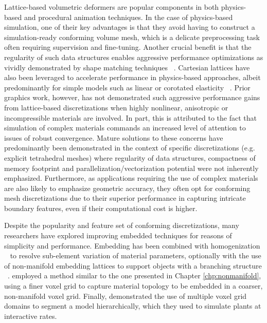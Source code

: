 Lattice-based volumetric deformers are popular components in both
physics-based and procedural animation techniques. In the case of
physics-based simulation, one of their key advantages is that they
avoid having to construct a simulation-ready conforming volume mesh,
which is a delicate preprocessing task often requiring supervision and
fine-tuning. Another crucial benefit is that the regularity of such
data structures enables aggressive performance optimizations as
vividly demonstrated by shape matching techniques
~\citep{RiverJ:2007}. Cartesian lattices have also been leveraged to
accelerate performance in physics-based approaches, albeit
predominantly for simple models such as linear or corotated elasticity
~\citep{MuellTG:2004,GeorgW:2008,McAdaZSETTS:2011}. Prior graphics
work, however, has not demonstrated such aggressive performance gains
from lattice-based discretizations when highly nonlinear, anisotropic
or incompressible materials are involved. In part, this is attributed
to the fact that simulation of complex materials commands an increased
level of attention to issues of robust convergence. Mature solutions
to these concerns have predominantly been demonstrated in the context
of specific discretizations (e.g. explicit tetrahedral meshes) where
regularity of data structures, compactness of memory footprint and
parallelization/vectorization potential were not inherently
emphasized. Furthermore, as applications requiring the use of complex
materials are also likely to emphasize geometric accuracy, they often
opt for conforming mesh discretizations due to their superior
performance in capturing intricate boundary features, even if their
computational cost is higher.

Despite the popularity and feature set of conforming discretizations,
many researchers have explored improving embedded techniques for
reasons of simplicity and performance. Embedding has been combined
with homogenization ~\citep{NesmePF:2006,KhareMOD:2009} to resolve
sub-element variation of material parameters, optionally with the use
of non-manifold embedding lattices to support objects with a branching
structure ~\citep{NesmeKJF:2009}. 
\citet{JerabBBFA:2010} employed a method similar to the one
presented in Chapter \ref{chp:nonmanifold}, using a finer voxel grid
to capture material topology to be embedded in a coarser, non-manifold
voxel grid. Finally, \citet{ZhaoB:2013}
demonstrated the use of multiple voxel grid domains to segment a model
hierarchically, which they used to simulate plants at interactive
rates.

